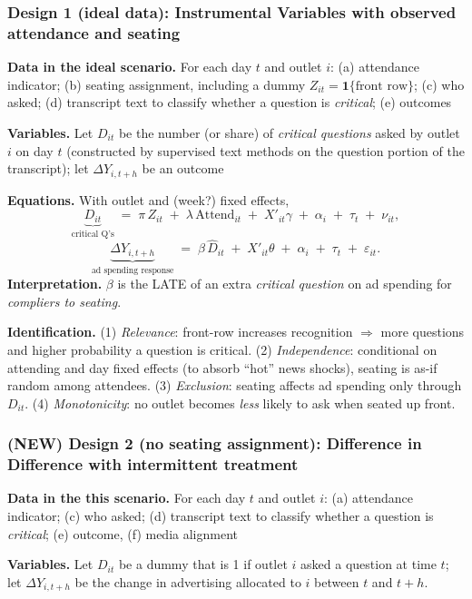 \documentclass[11pt]{article}
\begin{document}
\subsubsection*{Design 1 (ideal data): Instrumental Variables with observed attendance and seating}
\textbf{Data in the ideal scenario.} For each day $t$ and outlet $i$: (a) attendance indicator; (b) seating assignment, including a dummy $Z_{it}=\mathbf{1}\{\text{front row}\}$; (c) who asked; (d) transcript text to classify whether a question is \emph{critical}; (e) outcomes

\textbf{Variables.} Let $D_{it}$ be the number (or share) of \emph{critical questions} asked by outlet $i$ on day $t$ (constructed by supervised text methods on the question portion of the transcript); let $\Delta Y_{i,t+h}$ be an outcome

\textbf{Equations.} With outlet and (week?) fixed effects,
\[
\underbrace{D_{it}}_{\text{critical Q's}}\;=\;\pi\,Z_{it}\;+\;\lambda\,\text{Attend}_{it}\;+\;X'_{it}\gamma\;+\;\alpha_i\;+\;\tau_t\;+\;\nu_{it},
\]
\[
\underbrace{\Delta Y_{i,t+h}}_{\text{ad spending response}}\;=\;\beta\,\widehat{D}_{it}\;+\;X'_{it}\theta\;+\;\alpha_i\;+\;\tau_t\;+\;\varepsilon_{it}.
\]
\textbf{Interpretation.} $\beta$ is the LATE of an extra \emph{critical question} on ad spending for \emph{compliers to seating}. 

\textbf{Identification.} (1) \emph{Relevance}: front-row increases recognition $\Rightarrow$ more questions and higher probability a question is critical. (2) \emph{Independence}: conditional on attending and day fixed effects (to absorb ``hot'' news shocks), seating is as-if random among attendees. (3) \emph{Exclusion}: seating affects ad spending only through $D_{it}$. (4) \emph{Monotonicity}: no outlet becomes \emph{less} likely to ask when seated up front.


\subsubsection*{(NEW) Design 2 (no seating assignment): Difference in Difference with intermittent treatment}
\textbf{Data in the this scenario.} For each day $t$ and outlet $i$: (a) attendance indicator; (c) who asked; (d) transcript text to classify whether a question is \emph{critical}; (e) outcome, (f) media alignment

\textbf{Variables.} Let $D_{it}$ be a dummy that is 1 if outlet $i$ asked a question at time $t$; let $\Delta Y_{i,t+h}$ be the change in advertising allocated to $i$ between $t$ and $t{+}h$.
\end{document}
